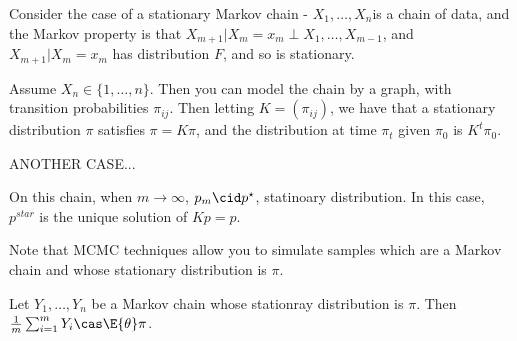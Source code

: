 Consider the case of a stationary Markov chain - $X_{1}, \dots,
X_{n}$is a chain of data, and the Markov property is that $X_{m+1} |
X_{m}= x_{m} \perp X_{1}, \dots, X_{m-1}$, and $X_{m+1} | X_{m} =
x_{m}$ has distribution $F$, and so is stationary.

Assume $X_{n} \in \{ 1, \dots, n \}$.  Then you can model the chain by
a graph, with transition probabilities $\pi_{ij}$.  Then letting $K =
(\pi_{ij})$, we have that a stationary distribution $\pi$ satisfies
$\pi = K \pi$, and the distribution at time $\pi_{t}$ given $\pi_{0}$
is $K^{t} \pi_{0}$.

ANOTHER CASE...

On this chain, when $m \rightarrow \infty$, $p_{m} \cid p^{\star}$,
statinoary distribution.  In this case, $p^{star}$ is the unique
solution of $Kp = p$.

Note that MCMC techniques allow you to simulate samples which are a
Markov chain and whose stationary distribution is $\pi$.


Let $Y_{1}, \dots, Y_{n}$ be a Markov chain whose stationray
distribution is $\pi$.  Then $\frac{1}{m} \sum_{i=1}^{m} Y_{i} \cas
\E{\theta} \pi$.


